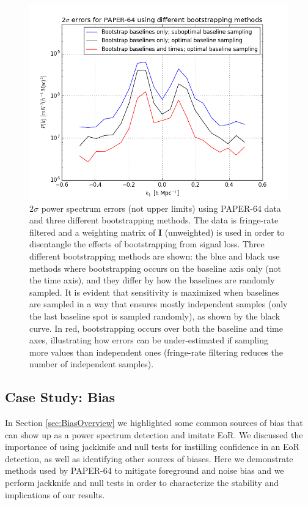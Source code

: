 \documentclass[preprint2,numberedappendix,tighten]{aastex6}  %
\begin{document}
\begin{figure}
	\centering
	\includegraphics[width=\columnwidth]{plots/data_errors.png}
	\caption{$2\sigma$ power spectrum errors (not upper limits) using PAPER-64 data and three different bootstrapping methods. The data is fringe-rate filtered and a weighting matrix of $\textbf{I}$ (unweighted) is used in order to disentangle the effects of bootstrapping from signal loss. Three different bootstrapping methods are shown: the blue and black use methods where bootstrapping occurs on the baseline axis only (not the time axis), and they differ by how the baselines are randomly sampled. It is evident that sensitivity is maximized when baselines are sampled in a way that ensures mostly independent samples (only the last baseline spot is sampled randomly), as shown by the black curve. In red, bootstrapping occurs over both the baseline and time axes, illustrating how errors can be under-estimated if sampling more values than independent ones (fringe-rate filtering reduces the number of independent samples).}
	\label{fig:data_errors}
\end{figure}


\subsection{Case Study: Bias}
\label{sec:Bias}

In Section \ref{sec:BiasOverview} we highlighted some common sources of bias that can show up as a power spectrum detection and imitate EoR. We discussed the importance of using jackknife and null tests for instilling confidence in an EoR detection, as well as identifying other sources of biases. Here we demonstrate methods used by PAPER-64 to mitigate foreground and noise bias and we perform jackknife and null tests in order to characterize the stability and implications of our results.
\end{document}
